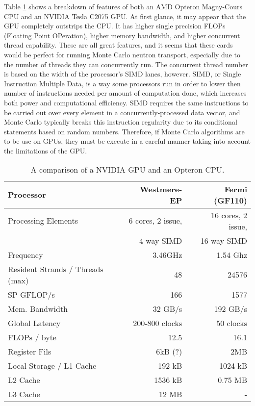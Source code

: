 Table \ref{gpu_cpu_comp} shows a breakdown of features of both an AMD Opteron Magny-Cours CPU and an NVIDIA Tesla C2075 GPU.  At first glance, it may appear that the GPU completely outstrips the CPU.  It has higher single precision FLOPs (Floating Point OPeration), higher memory bandwidth, and higher concurrent thread capability.  These are all great features, and it seems that these cards would be perfect for running Monte Carlo neutron transport, especially due to the number of threads they can concurrently run.  The concurrent thread number is based on the width of the processor's SIMD lanes, however.  SIMD, or Single Instruction Multiple Data, is a way some processors run in order to lower then number of instructions needed per amount of computation done, which increases both power and computational efficiency.  SIMD requires the same instructions to be carried out over every element  in a concurrently-processed data vector, and Monte Carlo typically breaks this instruction regularity due to its conditional statements based on random numbers.  Therefore, if Monte Carlo algorithms are to be use on GPUs, they must be execute in a careful manner taking into account the limitations of the GPU.

\begin{table}[h]
\centering
\caption{A comparison of a NVIDIA GPU and an Opteron CPU.}
\label{gpu_cpu_comp}
\begin{tabular}{| l | r | r |}
\hline
Processor & Westmere-EP & Fermi (GF110) \\
\hline
\hline
Processing Elements & 6 cores, 2 issue, & 16 cores, 2 issue, \\
& 4-way SIMD &  16-way SIMD  \\
\hline
Frequency & 3.46GHz &  1.54 Ghz \\
\hline
Resident Strands / Threads (max) & 48 & 24576 \\
\hline
SP GFLOP/s & 166 & 1577 \\
\hline
Mem. Bandwidth &  32 GB/s & 192 GB/s \\
\hline
Global Latency & 200-800 clocks & ~50 clocks \\
\hline
FLOPs / byte & 12.5  & 16.1 \\
\hline
Register Fils & 6kB (?) & 2MB \\
\hline
Local Storage / L1 Cache & 192 kB & 1024 kB \\
\hline
L2 Cache & 1536 kB & 0.75 MB \\
\hline
L3 Cache & 12 MB & - \\
\hline
\end{tabular}
\end{table}

